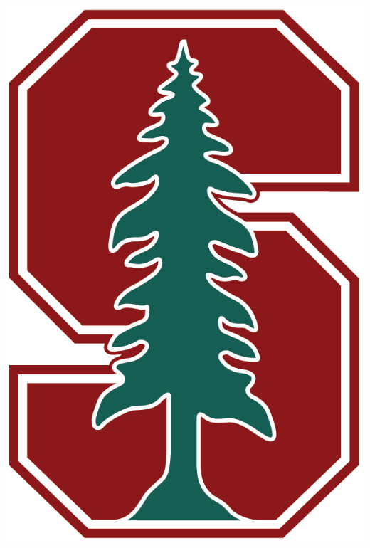 \documentclass[aspectratio=169]{beamer}
\theoremstyle{remark}
\begin{document}
\begin{frame}
\begin{columns}
\begin{column}{0.33\textwidth}
            \includegraphics[height=0.35\textheight]{./figures/Block_S_3_color.png}
            

\end{column}
\end{columns}
\end{frame}
\end{document}
